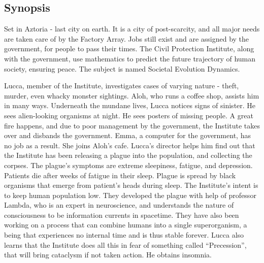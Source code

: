 \documentclass[11pt]{article}
\begin{document}
	\subsection{Synopsis}
	Set in Aztoria - last city on earth. 
	It is a city of post-scarcity, and all major needs are taken care of by the Factory Array.
	Jobs still exist and are assigned by the government, for people to pass their times.
	The Civil Protection Institute, along with the government, use mathematics to predict the future trajectory of human society, ensuring peace.
	The subject is named Societal Evolution Dynamics.
	
	Lucca, member of the Institute, investigates cases of varying nature - theft, murder, even whacky monster sightings.
	Aloh, who runs a coffee shop, assists him in many ways.
	Underneath the mundane lives, Lucca notices signs of sinister. 
	He sees alien-looking organisms at night. 
	He sees posters of missing people. 
	A great fire happens, and due to poor management by the government, the Institute takes over and disbands the government. 
	Emma, a computer for the government, has no job as a result.
	She joins Aloh's cafe.
	Lucca's director helps him find out that the Institute has been releasing a plague into the population, and collecting the corpses. 
	The plague's symptoms are extreme sleepiness, fatigue, and depression.
	Patients die after weeks of fatigue in their sleep.
	Plague is spread by black organisms that emerge from patient's heads during sleep.
	The Institute's intent is to keep human population low. 
	They developed the plague with help of professor Lambda, who is an expert in neuroscience, and understands the nature of consciousness to be information currents in spacetime.
	They have also been working on a process that can combine humans into a single superorganism, a being that experiences no internal time and is thus stable forever.
	Lucca also learns that the Institute does all this in fear of something called ``Precession'', that will bring cataclysm if not taken action.
	He obtains insomnia.
	
\end{document}
